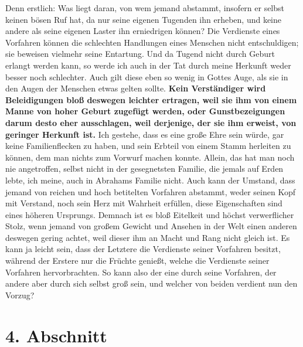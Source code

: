 Denn erstlich: Was liegt daran, von wem jemand
abstammt, insofern er selbst
keinen bösen Ruf hat, da nur seine eigenen Tugenden ihn erheben, und keine
andere als seine eigenen Laster ihn
erniedrigen können? Die Verdienste eines
Vorfahren können die schlechten Handlungen eines Menschen nicht
entschuldigen;
sie beweisen vielmehr seine Entartung. Und da Tugend nicht durch Geburt erlangt
werden kann, so werde ich auch in der Tat durch meine Herkunft weder besser noch
schlechter. Auch gilt diese eben so wenig in Gottes Auge, als sie in den Augen
der Menschen etwas gelten sollte. \label{ref:11_03_beleidigung}
\textbf{Kein Verständiger wird Beleidigungen bloß
deswegen leichter ertragen, weil sie ihm von einem Manne von hoher Geburt
zugefügt werden, oder Gunstbezeigungen darum desto eher ausschlagen, weil
derjenige, der sie ihm erweist, von geringer Herkunft ist.} Ich gestehe, dass es
eine große Ehre sein würde, gar keine Familienflecken zu haben, und sein
Erbteil von einem Stamm herleiten zu können, dem man nichts zum Vorwurf
machen konnte. Allein, das hat man noch nie angetroffen, selbst nicht in der
gesegnetsten Familie, die jemals auf Erden lebte, ich meine, auch in
Abrahams
Familie nicht. Auch kann der Umstand, dass jemand von reichen und hoch
betitelten
Vorfahren abstammt, weder seinen Kopf mit Verstand, noch sein Herz mit Wahrheit
erfüllen, diese Eigenschaften sind eines höheren Ursprungs. Demnach ist es bloß
Eitelkeit und höchst verwerflicher Stolz, wenn jemand von großem
Gewicht und
Ansehen in der Welt einen anderen deswegen gering achtet, weil dieser ihm an
Macht und Rang nicht gleich ist. Es kann ja leicht sein, dass der Letztere die
Verdienste seiner Vorfahren besitzt, während der Erstere nur die Früchte
genießt, welche die Verdienste seiner Vorfahren hervorbrachten. So kann also der
eine durch seine Vorfahren, der andere aber durch sich selbst groß sein, und
welcher von beiden verdient nun den Vorzug?

\section{4. Abschnitt} \label{kap11_ab4}

